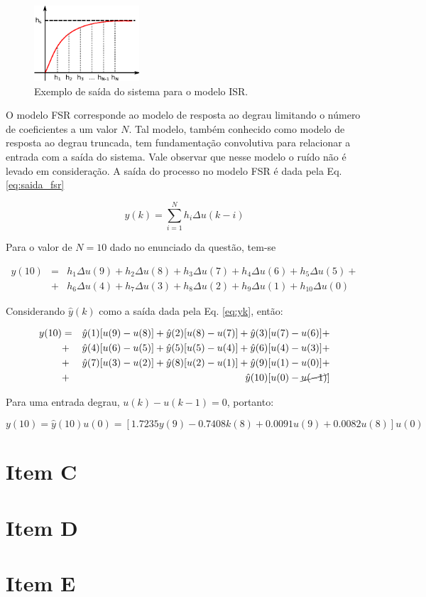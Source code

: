 \begin{figure}[htb]
\centering
    \includegraphics[width=0.35\textwidth]{imgs/questao1/isr}
    \caption{Exemplo de saída do sistema para o modelo ISR.}
    \label{fig:isr}
\end{figure}

O modelo FSR corresponde ao modelo de resposta ao degrau limitando o número de
coeficientes a um valor $N$. Tal modelo, também conhecido como modelo de
resposta ao degrau truncada, tem fundamentação convolutiva para relacionar a
entrada com a saída do sistema. Vale observar que nesse modelo o ruído não é
levado em consideração. A saída do processo no modelo FSR é dada pela Eq.
\ref{eq:saida_fsr}

\begin{equation}\label{eq:saida_fsr}
y(k) = \sum_{i=1}^N h_i\Delta u(k-i)
\end{equation}

Para o valor de $N = 10$ dado no enunciado da questão, tem-se

\begin{eqnarray}
y(10) & = & h_1\Delta u(9) + h_2\Delta u(8) + h_3\Delta u(7) + h_4\Delta u(6) +
            h_5\Delta u(5) + \nonumber\\ 
      & + & h_6\Delta u(4) + h_7\Delta u(3) + h_8\Delta u(2) + h_9\Delta u(1) + 
            h_{10}\Delta u(0)\nonumber
\end{eqnarray}

Considerando $\hat{y}(k)$ como a saída dada pela Eq. \ref{eq:yk}, então:

\begin{eqnarray}
y(10) & = & \hat{y}(1)[u(9)-u(8)] + 
            \hat{y}(2)[u(8)-u(7)] + 
            \hat{y}(3)[u(7)-u(6)] + \nonumber\\
      & + & \hat{y}(4)[u(6)-u(5)] +
            \hat{y}(5)[u(5)-u(4)] +
            \hat{y}(6)[u(4)-u(3)] + \nonumber\\
      & + & \hat{y}(7)[u(3)-u(2)] +
            \hat{y}(8)[u(2)-u(1)] +
            \hat{y}(9)[u(1)-u(0)] + \nonumber\\
      & + & \hat{y}(10)[u(0)-\cancel{u(-1)}] \nonumber
\end{eqnarray}

Para uma entrada degrau, $u(k) - u(k-1) = 0$, portanto:

\begin{equation}
y(10) = \hat{y}(10)u(0) = 
        [1.7235y(9) - 0.7408k(8) + 0.0091u(9) + 0.0082u(8)]u(0)
\end{equation}


\section*{Item C}
\section*{Item D}
\section*{Item E}
